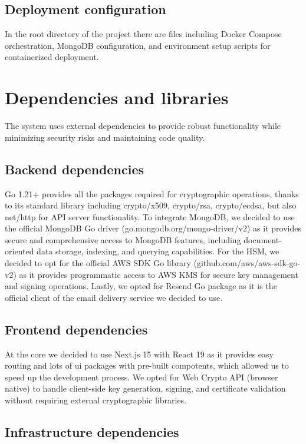 \subsection{Deployment configuration}
In the root directory of the project there are files including Docker Compose 
orchestration, MongoDB configuration, and environment setup scripts for 
containerized deployment.

\section{Dependencies and libraries}

The system uses external dependencies to provide robust functionality 
while minimizing security risks and maintaining code quality.

\subsection{Backend dependencies}
Go 1.21+ provides all the packages required for cryptographic operations, thanks to 
its standard library including crypto/x509, crypto/rsa, crypto/ecdsa, but also net/http 
for API server functionality.
To integrate MongoDB, we decided to use the official MongoDB Go driver (go.mongodb.org/mongo-driver/v2) 
as it provides secure and comprehensive access to MongoDB features, including 
document-oriented data storage, indexing, and querying capabilities.
For the HSM, we decided to opt for the official AWS SDK Go library (github.com/aws/aws-sdk-go-v2) 
as it provides programmatic access to AWS KMS for secure key management and signing 
operations.
Lastly, we opted for Resend Go package as it is the official client of the email delivery service
we decided to use.


\subsection{Frontend dependencies}

At the core we decided to use Next.js 15 with React 19 as it provides easy routing and
lots of ui packages with pre-built compotents, which allowed us to speed up the development process.
We opted for Web Crypto API (browser native) to handle 
client-side key generation, signing, and certificate validation without requiring 
external cryptographic libraries.

\subsection{Infrastructure dependencies}

